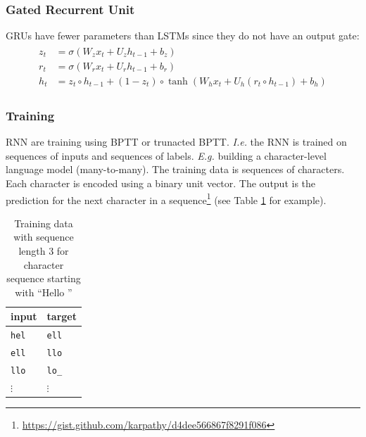\documentclass[a4paper,twoside,10pt]{article}
\begin{document}
\subsubsection{Gated Recurrent Unit}
\acp{GRU} have fewer parameters than \acp{LSTM} since they do not have an output gate\citep{wiki:gru}:
\begin{align*}
  \begin{split}
    z_t &= \sigma(W_{z} x_t + U_{z} h_{t-1} + b_z) \\
    r_t &= \sigma(W_{r} x_t + U_{r} h_{t-1} + b_r) \\
    h_t &=  z_t \circ h_{t-1} + (1-z_t) \circ \operatorname{tanh}(W_{h} x_t + U_{h} (r_t \circ h_{t-1}) + b_h)
  \end{split}
\end{align*}

\subsubsection{Training}
\ac{RNN} are training using \ac{BPTT} or trunacted \ac{BPTT}.
\emph{I.e.} the \ac{RNN} is trained on sequences of inputs and sequences of labels.
\emph{E.g.} building a character-level language model (many-to-many)\citep{karpathy2016cs231n}.
The training data is sequences of characters. Each character is encoded using a binary unit vector.
The output is the prediction for the next character in a sequence\footnote{\url{https://gist.github.com/karpathy/d4dee566867f8291f086}} (see Table \ref{tbl:hello} for example).
\begin{table}[htbp]
  \begin{center}
    \begin{tabular}{l|l}\toprule
      \textbf{input}&\textbf{target}\\\midrule
      \texttt{hel} & \texttt{ell}\\
      \texttt{ell} & \texttt{llo}\\
      \texttt{llo} & \texttt{lo\_}\\
      $\vdots$ & $\vdots$\\\bottomrule
    \end{tabular}
    \caption{Training data with sequence length 3 for character sequence starting with ``Hello ''\label{tbl:hello}}
  \end{center}
\end{table}

\end{document}
